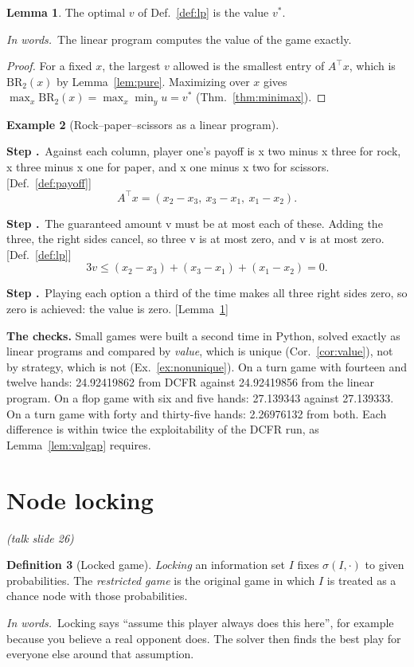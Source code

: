 \documentclass[11pt]{article}
\theoremstyle{definition}
\newtheorem{definition}{Definition}[section]
\newtheorem{example}[definition]{Example}
\newtheorem{lemma}[definition]{Lemma}
\newcommand{\inwords}{\par\smallskip\noindent\textit{In words.}\ }
\newcounter{stp}
\newcommand{\steps}{\setcounter{stp}{0}}
\newcommand{\st}{\stepcounter{stp}\par\medskip\noindent\textbf{Step \arabic{stp}.}\ }
\newcommand{\by}[1]{\hfill{\small\color{blue!50!black}[#1]}}
\newcommand{\Def}[1]{Def.~\ref{#1}}\newcommand{\Lem}[1]{Lemma~\ref{#1}}\newcommand{\Thm}[1]{Thm.~\ref{#1}}
\newcommand{\Ex}[1]{Ex.~\ref{#1}}\newcommand{\Rem}[1]{Remark~\ref{#1}}\newcommand{\Alg}[1]{Alg.~\ref{#1}}\newcommand{\Cor}[1]{Cor.~\ref{#1}}
\newcommand{\slide}[1]{\hfill{\small\itshape (talk slide #1)}}
\begin{document}
\begin{lemma}\label{lem:lp}
The optimal $v$ of \Def{def:lp} is the value $v^\ast$.
\inwords The linear program computes the value of the game exactly.
\end{lemma}
\begin{proof}
For a fixed $x$, the largest $v$ allowed is the smallest entry of $A^\top x$, which is $\mathrm{BR}_2(x)$ by \Lem{lem:pure}.
Maximizing over $x$ gives $\max_x\mathrm{BR}_2(x)=\max_x\min_yu=v^\ast$ (\Thm{thm:minimax}).
\end{proof}

\begin{example}[Rock--paper--scissors as a linear program]\label{ex:lp}
\steps
\st Against each column, player one's payoff is x two minus x three for rock, x three minus x one for paper, and x one minus x
two for scissors. \by{\Def{def:payoff}}
\[ A^\top x=(x_2-x_3,\ x_3-x_1,\ x_1-x_2). \]
\st The guaranteed amount v must be at most each of these. Adding the three, the right sides cancel, so three v is at most
zero, and v is at most zero. \by{\Def{def:lp}}
\[ 3v\le(x_2-x_3)+(x_3-x_1)+(x_1-x_2)=0. \]
\st Playing each option a third of the time makes all three right sides zero, so zero is achieved: the value is zero.
\by{\Lem{lem:lp}}
\end{example}

\textbf{The checks.} Small games were built a second time in Python, solved exactly as linear programs and compared by
\emph{value}, which is unique (\Cor{cor:value}), not by strategy, which is not (\Ex{ex:nonunique}). On a turn game with
fourteen and twelve hands: 24.92419862 from DCFR against 24.92419856 from the linear program. On a flop game with six and
five hands: 27.139343 against 27.139333. On a turn game with forty and thirty-five hands: 2.26976132 from both. Each
difference is within twice the exploitability of the DCFR run, as \Lem{lem:valgap} requires.
\section{Node locking}\label{sec:lock}\slide{26}
\begin{definition}[Locked game]\label{def:lock}
\emph{Locking} an information set $I$ fixes $\sigma(I,\cdot)$ to given probabilities. The \emph{restricted game} is the original
game in which $I$ is treated as a chance node with those probabilities.
\inwords Locking says ``assume this player always does this here'', for example because you believe a real opponent
does. The solver then finds the best play for everyone else around that assumption.
\end{definition}
\end{document}
